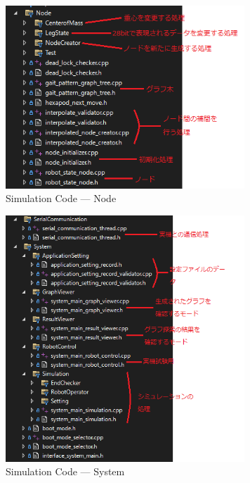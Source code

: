 \begin{figure}[htbp]
  \begin{center}
    \includegraphics[width=90mm, clip]{figure/appendix/C++_Node.png}
    \caption{Simulation Code --- Node}
    \label{fig:6} %
  \end{center}
\end{figure}

\begin{figure}[htbp]
  \begin{center}
    \includegraphics[width=90mm, clip]{figure/appendix/C++_System.png}
    \caption{Simulation Code --- System}
    \label{fig:7} %
  \end{center}
\end{figure}

\newpage

